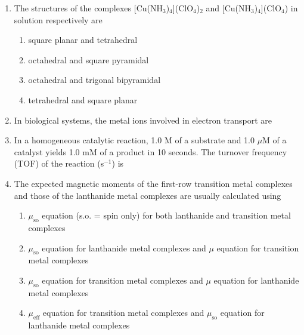 \documentclass[12pt]{article}
\begin{document}
\begin{enumerate}
\item The structures of the complexes [Cu(NH$_3$)$_4$](ClO$_4$)$_2$ and [Cu(NH$_3$)$_4$](ClO$_4$) in solution respectively are
\begin{enumerate}
\item  square planar and tetrahedral 
\item  octahedral and square pyramidal
\item  octahedral and trigonal bipyramidal 
\item  tetrahedral and square planar    \hfill{}
\end{enumerate}


\item In biological systems, the metal ions involved in electron transport are
\begin{enumerate}
 \hfill{}
\end{enumerate}

\item In a homogeneous catalytic reaction, 1.0 M of a substrate and 1.0 $\mu$M of a catalyst yields 1.0 mM of a product in 10 seconds. The turnover frequency (TOF) of the reaction (s$^{-1}$) is
\begin{enumerate}
   \hfill{}
\end{enumerate}


\item The expected magnetic moments of the first-row transition metal complexes and those of the lanthanide metal complexes are usually calculated using
\begin{enumerate}
\item  $\mu_{\text{so}}$ equation (s.o. = spin only) for both lanthanide and transition metal complexes
\item  $\mu_{\text{so}}$ equation for lanthanide metal complexes and $\mu$ equation for transition metal complexes
\item  $\mu_{\text{so}}$ equation for transition metal complexes and $\mu$ equation for lanthanide metal complexes
\item  $\mu_{\text{eff}}$ equation for transition metal complexes and $\mu_{\text{so}}$ equation for lanthanide metal complexes    \hfill{}
\end{enumerate}





\end{enumerate}
\end{document}
